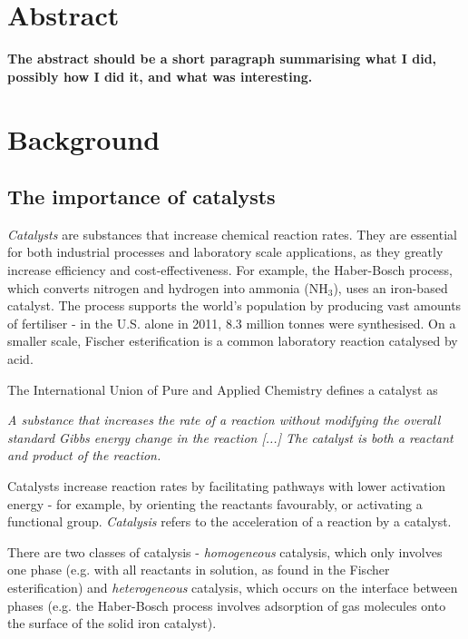 \documentclass[12pt,a4paper]{article}
\begin{document}

\newpage

\tableofcontents
\listoffigures
\listoftables
\newpage



\section{Abstract}\label{sec:abstract}
\textbf{The abstract should be a short paragraph summarising what I did, possibly how I did it, and what was interesting.}

\section{Background}\label{sec:intro}

\subsection{The importance of catalysts}\label{sec:catal}
\emph{Catalysts} are substances that increase chemical reaction rates. They are essential for both industrial processes and laboratory scale applications, as they greatly increase efficiency and cost-effectiveness. For example, the Haber-Bosch process, which converts nitrogen and hydrogen into ammonia (NH$_3$), uses an iron-based catalyst. The process supports the world's population by producing vast amounts of fertiliser - in the U.S. alone in 2011, 8.3 million tonnes were synthesised\cite{apodaca2011us}. On a smaller scale, Fischer esterification is a common laboratory reaction catalysed by acid.

The International Union of Pure and Applied Chemistry defines\cite{mcnaught2005iupac} a catalyst as

\begin{displayquote}
\emph{A substance that increases the rate of a reaction without modifying the overall standard Gibbs energy change in the reaction [...] The catalyst is both a reactant and product of the reaction.}
\end{displayquote}
Catalysts increase reaction rates by facilitating pathways with lower activation energy - for example, by orienting the reactants favourably, or activating a functional group. \emph{Catalysis} refers to the acceleration of a reaction by a catalyst.

There are two classes of catalysis\cite{mcnaught2005iupac} - \emph{homogeneous} catalysis, which only involves one phase (e.g. with all reactants in solution, as found in the Fischer esterification) and \emph{heterogeneous} catalysis, which occurs on the interface between phases (e.g. the Haber-Bosch process involves adsorption of gas molecules onto the surface of the solid iron catalyst\cite{schlogl2003catalytic}).
\end{document}

